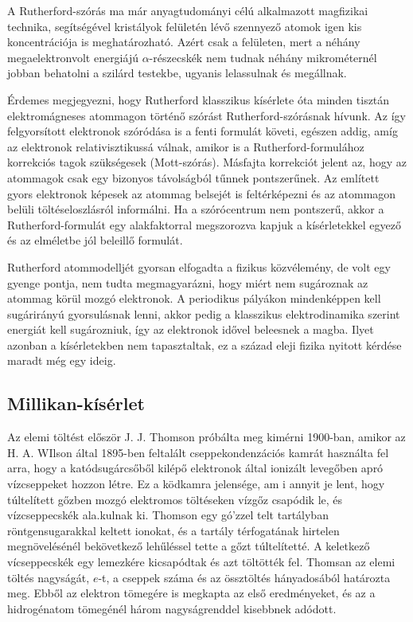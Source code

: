 \documentclass[a4paper,12pt]{article}
\begin{document}
A Rutherford-szórás ma már anyagtudományi célú alkalmazott magfizikai
technika, segítségével kristályok felületén lévő szennyező atomok igen
kis koncentrációja is meghatározható.
Azért csak a felületen, mert a néhány megaelektronvolt energiájú
$\alpha$-részecskék nem tudnak néhány mikrométernél jobban behatolni
a szilárd testekbe, ugyanis lelassulnak és megállnak.

Érdemes megjegyezni, hogy Rutherford klasszikus kísérlete óta minden
tisztán elektromágneses atommagon történő szórást Rutherford-szórásnak
hívunk.
Az így felgyorsított elektronok szóródása is a fenti formulát követi,
egészen addig, amíg az elektronok relativisztikussá válnak, amikor is
a Rutherford-formulához korrekciós tagok szükségesek (Mott-szórás).
Másfajta korrekciót jelent az, hogy az atommagok csak egy bizonyos
távolságból tűnnek pontszerűnek.
Az említett gyors elektronok képesek az atommag belsejét is feltérképezni
és az atommagon belüli töltéseloszlásról informálni.
Ha a szórócentrum nem pontszerű, akkor a Rutherford-formulát egy
alakfaktorral megszorozva kapjuk a kísérletekkel egyező és az elméletbe
jól beleillő formulát.

Rutherford atommodelljét gyorsan elfogadta a fizikus közvélemény,
de volt egy gyenge pontja, nem tudta megmagyarázni, hogy miért nem
sugároznak az atommag körül mozgó elektronok.
A periodikus pályákon mindenképpen kell sugárirányú gyorsulásnak lenni,
akkor pedig a klasszikus elektrodinamika szerint energiát kell sugározniuk,
így az elektronok idővel beleesnek a magba.
Ilyet azonban a kísérletekben nem tapasztaltak, ez a század eleji fizika
nyitott kérdése maradt még egy ideig.

\subsection{Millikan-kísérlet}
Az elemi töltést először J. J. Thomson próbálta meg kimérni 1900-ban, amikor az H. A. WIlson által 1895-ben feltalált cseppekondenzációs kamrát használta fel arra, hogy a katódsugárcsőből kilépő elektronok által ionizált levegőben apró vízcseppeket hozzon létre.
Ez a ködkamra jelensége, am i annyit je lent, hogy túltelített gőzben mozgó elektromos töltéseken vízgőz csapódik le, és vízcseppecskék ala.kulnak ki.
Thomson egy gó'zzel telt tartályban röntgensugarakkal keltett ionokat, és a tartály térfogatának hirtelen megnövelésénél bekövetkező lehűléssel tette
a gőzt túltelítetté. A keletkező vícseppecskék egy lemezkére kicsapódtak és azt töltötték fel. Thomsan az elemi töltés nagyságát, $e$-t, a cseppek száma
és az össztöltés hányadosából határozta meg. Ebből az elektron tömegére is megkapta az első eredményeket, és az a hidrogénatom tömegénél három nagyságrenddel kisebbnek adódott.
\end{document}
